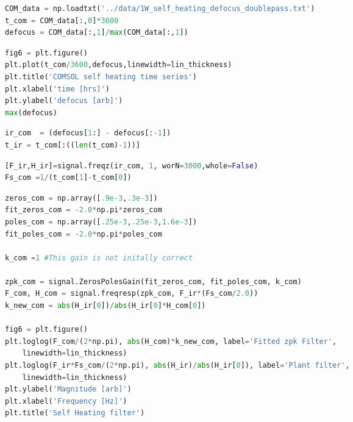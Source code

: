 \begin{spacing}{1.2} \begin{lstlisting}[frame=single,language=Python]
COM_data = np.loadtxt('../data/1W_self_heating_defocus_doublepass.txt')
t_com = COM_data[:,0]*3600
defocus = COM_data[:,1]/max(COM_data[:,1])
\end{lstlisting} \end{spacing}

\begin{spacing}{1.2} \begin{lstlisting}[frame=single,language=Python]
fig6 = plt.figure()
plt.plot(t_com/3600,defocus,linewidth=lin_thickness)
plt.title('COMSOL self heating time series')
plt.xlabel('time [hrs]')
plt.ylabel('defocus [arb]')
max(defocus)
\end{lstlisting} \end{spacing}


\begin{spacing}{1.2} \begin{lstlisting}[frame=single,language=Python]
ir_com  = (defocus[1:] - defocus[:-1])
t_ir = t_com[:((len(t_com)-1))]
\end{lstlisting} \end{spacing}

\begin{spacing}{1.2} \begin{lstlisting}[frame=single,language=Python]
[F_ir,H_ir]=signal.freqz(ir_com, 1, worN=3000,whole=False) 
Fs_com =1/(t_com[1]-t_com[0])
\end{lstlisting} \end{spacing}

\begin{spacing}{1.2} \begin{lstlisting}[frame=single,language=Python]
zeros_com = np.array([.9e-3,.3e-3])
fit_zeros_com = -2.0*np.pi*zeros_com
poles_com = np.array([.25e-3,.25e-3,1.6e-3])
fit_poles_com = -2.0*np.pi*poles_com

k_com =1 #This gain is not initally correct

zpk_com = signal.ZerosPolesGain(fit_zeros_com, fit_poles_com, k_com)
F_com, H_com = signal.freqresp(zpk_com, F_ir*(Fs_com/2.0))
k_new_com = abs(H_ir[0])/abs(H_ir[0]*H_com[0])

fig6 = plt.figure()
plt.loglog(F_com/(2*np.pi), abs(H_com)*k_new_com, label='Fitted zpk Filter', 
    linewidth=lin_thickness)
plt.loglog(F_ir*Fs_com/(2*np.pi), abs(H_ir)/abs(H_ir[0]), label='Plant filter', 
    linewidth=lin_thickness)
plt.ylabel('Magnitude [arb]')
plt.xlabel('Frequency [Hz]')
plt.title('Self Heating filter')
\end{lstlisting} \end{spacing}

